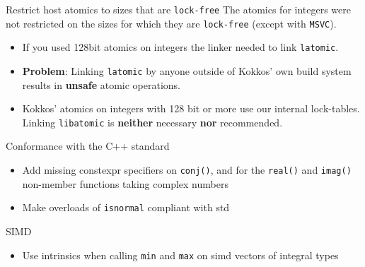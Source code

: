 
\begin{frame}[fragile]{Restrict host atomics to sizes that are \texttt{lock-free}}
  The atomics for integers were not restricted on the sizes for which they are \texttt{lock-free} (except with \texttt{MSVC}).
 \begin{itemize}
   \item If you used 128bit atomics on integers the linker needed to link \texttt{latomic}.
   \item \textbf{Problem}: Linking \texttt{latomic} by anyone outside of Kokkos' own build system results in \textbf{unsafe} atomic operations.
   \item Kokkos' atomics on integers with 128 bit or more use our internal lock-tables. Linking \texttt{libatomic} is \textbf{neither} necessary \textbf{nor} recommended.
 \end{itemize}
\end{frame}


\begin{frame}[fragile]{Conformance with the C++ standard}
  \begin{itemize}
    \item Add missing constexpr specifiers on \texttt{conj()}, and for the \texttt{real()} and \texttt{imag()} non-member functions taking complex numbers
    \item Make overloads of \texttt{isnormal} compliant with std
  \end{itemize}
\end{frame}


\begin{frame}[fragile]{SIMD}
  \begin{itemize}
    \item Use intrinsics when calling \texttt{min} and \texttt{max} on simd vectors of integral types
  \end{itemize}
\end{frame}
